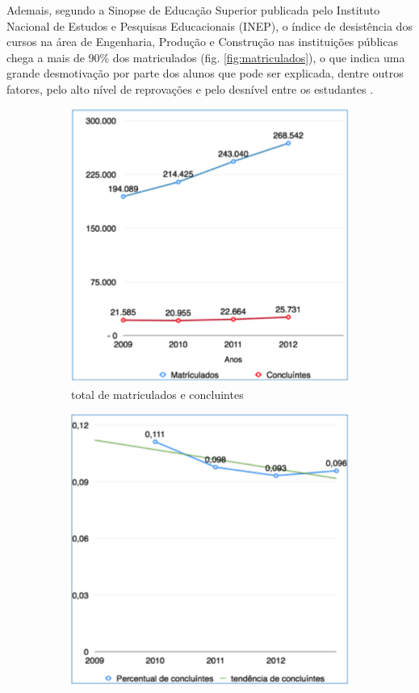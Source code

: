 Ademais, segundo a Sinopse de Educação Superior publicada pelo Instituto Nacional de Estudos e Pesquisas Educacionais (INEP), o índice de desistência dos cursos na área de Engenharia, Produção e Construção nas instituições públicas chega a mais de 90\% dos matriculados (fig.  \ref{fig:matriculados}), o que indica uma grande desmotivação por parte dos alunos que pode ser explicada, dentre outros fatores, pelo alto nível de reprovações e pelo desnível entre os estudantes \cite{silva2005}.

\begin{figure}
	\begin{subfigure}{.5\textwidth}
  		\centering
  		\includegraphics[width=.9\linewidth]{figuras/matriculados1.eps}
  		\caption{total de matriculados e concluintes}
  		\label{fig:submat1}
	\end{subfigure}%
	\begin{subfigure}{.5\textwidth}
  		\centering
  		\includegraphics[width=.9\linewidth]{figuras/matriculados2.eps}

\end{subfigure}
\end{figure}
